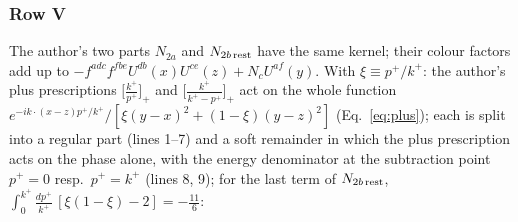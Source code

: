 \subsubsection*{Row V}
The author's two parts $N_{2a}$ and $N_{2b\,\rm rest}$ have the same kernel; their colour factors add up to $-f^{adc}f^{fbe}U^{db}(x)U^{ce}(z)+N_{c}U^{af}(y)$. With $\xi\equiv p^{+}/k^{+}$: the author's plus prescriptions $\big[\frac{k^{+}}{p^{+}}\big]_{+}$ and $\big[\frac{k^{+}}{k^{+}-p^{+}}\big]_{+}$ act on the whole function $e^{-ik\cdot(x-z)p^{+}/k^{+}}/[\xi(y-x)^{2}+(1-\xi)(y-z)^{2}]$ (Eq.~\eqref{eq:plus}); each is split into a regular part (lines 1--7) and a soft remainder in which the plus prescription acts on the phase alone, with the energy denominator at the subtraction point $p^{+}=0$ resp.\ $p^{+}=k^{+}$ (lines 8, 9); for the last term of $N_{2b\,\rm rest}$, $\int_{0}^{k^{+}}\frac{dp^{+}}{k^{+}}\,[\xi(1-\xi)-2]=-\frac{11}{6}$:
